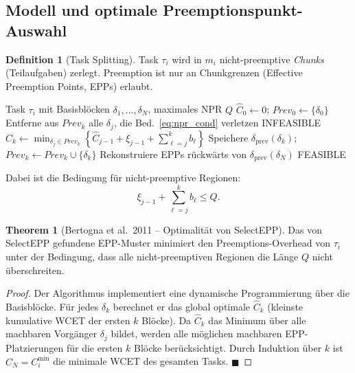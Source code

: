 ﻿\documentclass[a4paper,12pt]{report}
\theoremstyle{definition}
\newtheorem{definition}{Definition}[chapter]
\newtheorem{theorem}{Theorem}[chapter]
\begin{document}
\subsection{Modell und optimale Preemptionspunkt-Auswahl}

\begin{definition}[Task Splitting]
	Task $\tau_i$ wird in $m_i$ nicht-preemptive \emph{Chunks} (Teilaufgaben) zerlegt.
	Preemption ist nur an Chunkgrenzen (Effective Preemption Points, EPPs) erlaubt.
\end{definition}

\begin{algorithm}[H]
	\caption{SelectEPP -- Optimale Preemptionspunktauswahl (Bertogna et al.\ 2011)}
	\begin{algorithmic}[1]
		\Require Task $\tau_i$ mit Basisblöcken $\delta_1,\ldots,\delta_N$, maximales NPR $Q$
		\State $\hat{C}_0 \leftarrow 0$; $\mathit{Prev}_0 \leftarrow \{\delta_0\}$
		\State Entferne aus $\mathit{Prev}_k$ alle $\delta_j$, die Bed.~\eqref{eq:npr_cond} verletzen
		 \Return INFEASIBLE \EndIf
		\State $\hat{C}_k \leftarrow \min_{\delta_j \in \mathit{Prev}_k}\left\{\hat{C}_{j-1} + \xi_{j-1} + \sum_{\ell=j}^{k} b_\ell\right\}$
		\State Speichere $\delta_{\mathrm{prev}}(\delta_k)$; $\mathit{Prev}_k \leftarrow \mathit{Prev}_k \cup \{\delta_k\}$
		\EndFor
		\State Rekonstruiere EPPs rückwärts von $\delta_{\mathrm{prev}}(\delta_N)$
		\State \Return FEASIBLE
	\end{algorithmic}
\end{algorithm}

Dabei ist die Bedingung für nicht-preemptive Regionen:
\begin{equation}
	\xi_{j-1} + \sum_{\ell=j}^{k} b_\ell \leq Q.
	\label{eq:npr_cond}
\end{equation}

\begin{theorem}[Bertogna et al.\ 2011 -- Optimalität von SelectEPP]
	Das von SelectEPP gefundene EPP-Muster minimiert den Preemptions-Overhead
	von $\tau_i$ unter der Bedingung, dass alle nicht-preemptiven Regionen die
	Länge $Q$ nicht überschreiten.
\end{theorem}

\begin{proof}
	Der Algorithmus implementiert eine dynamische Programmierung über die
	Basisblöcke. Für jedes $\delta_k$ berechnet er das global optimale $\hat{C}_k$
	(kleinste kumulative WCET der ersten $k$ Blöcke). Da $\hat{C}_k$ das Minimum
	über alle machbaren Vorgänger $\delta_j$ bildet, werden alle möglichen
	machbaren EPP-Platzierungen für die ersten $k$ Blöcke berücksichtigt.
	Durch Induktion über $k$ ist $\hat{C}_N = C_i^{\min}$ die minimale WCET
	des gesamten Tasks. \hfill$\blacksquare$
\end{proof}
\end{document}
